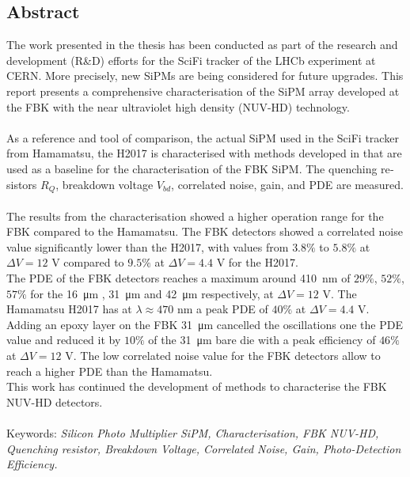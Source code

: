 

\begin{otherlanguage}{american}
	\chapter*{Abstract}
The work presented in the thesis has been conducted as part of the research and development (R\&D) efforts for the \ac{SciFi} tracker of the LHCb experiment at CERN.  More precisely, new SiPMs are being considered for future upgrades. This report presents a comprehensive characterisation of the \ac{SiPM} array developed at the \ac{FBK} with the near ultraviolet high density (NUV-HD) technology. \\
\\
As a reference and tool of comparison, the actual SiPM used in the SciFi tracker from Hamamatsu, the H2017 is characterised with methods developed in \cite{Girard2018CharacterisationDistributions} that are used as a baseline for the characterisation of the FBK SiPM. The quenching resistors $R_Q$, breakdown voltage $V_{bd}$, correlated noise, gain, and \ac{PDE} are measured. \\
\\
The results from the characterisation showed a higher operation range for the FBK compared to the Hamamatsu.
The FBK detectors showed a correlated noise value significantly lower than the H2017, with values from $3.8\%$ to $5.8\%$ at $\Delta V = 12$ V compared to $9.5\%$ at $\Delta V = 4.4$ V for the H2017. \\

The PDE of the FBK detectors reaches a maximum around \SI{410}{\nano m} of $29\%$, $52\%$, $57\%$ for the \SI{16}{\micro m} , \SI{31}{\micro m} and \SI{42}{\micro m} respectively, at $\Delta V = 12$ V. The Hamamatsu H2017 has at $\lambda \approx 470$ nm a peak PDE of $40\%$ at $\Delta V = 4.4$ V. Adding an epoxy layer on the FBK \SI{31}{\micro m} cancelled the oscillations one the PDE value and reduced it by $10\%$ of the \SI{31}{\micro m} bare die with a peak efficiency of $46\%$ at $\Delta V=12$ V.
The low correlated noise value for the FBK detectors allow to reach a higher PDE than the Hamamatsu.\\

This work has continued the development of methods to characterise the FBK NUV-HD detectors. \\
\\

Keywords: \textit{Silicon Photo Multiplier SiPM, Characterisation, FBK NUV-HD, Quenching resistor, Breakdown Voltage, Correlated Noise, Gain, Photo-Detection Efficiency.}

\end{otherlanguage}

